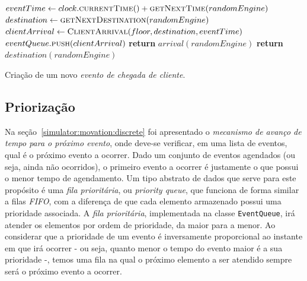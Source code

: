 \begin{description}
  \begin{algorithm}[htb]
  \begin{center}
  \begin{algorithmic}[1]
    \State $eventTime \leftarrow clock.\Call{currentTime}{}() + \Call{getNextTime}{randomEngine}$
    \State $destination \leftarrow \Call{getNextDestination}{randomEngine}$
    \State $clientArrival \leftarrow \Call{ClientArrival}{floor, destination, eventTime}$
    \State $eventQueue.\Call{push}{clientArrival}$
  \EndFunction
  \State
    \State \textbf{return} $arrival(randomEngine)$
  \EndFunction
  \State
    \State \textbf{return} $destination(randomEngine)$
  \EndFunction
  \end{algorithmic}
  \end{center}
  \caption{\label{alg:eventcreation}Criação de um novo \textit{evento de chegada de cliente}.}
  \end{algorithm}
\end{description}

\subsection{Priorização} \label{model:queue}

Na seção~\ref{simulator:movation:discrete} foi apresentado o \textit{mecanismo
de avanço de tempo para o próximo evento}, onde deve-se verificar, em uma lista
de eventos, qual é o próximo evento a ocorrer. Dado um conjunto de eventos
agendados (ou seja, ainda não ocorridos), o primeiro evento a ocorrer é
justamente o que possui o menor tempo de agendamento. Um tipo abstrato de dados
que serve para este propósito é uma \textit{fila prioritária}, ou
\textit{priority queue}, que funciona de forma similar a filas \textit{FIFO},
com a diferença de que cada elemento armazenado possui uma prioridade associada.
A \textit{fila prioritária}, implementada na classe \texttt{EventQueue}, irá
atender os elementos por ordem de prioridade, da maior para a menor. Ao
considerar que a prioridade de um evento é inversamente proporcional ao instante
em que irá ocorrer - ou seja, quanto menor o tempo do evento maior é a sua
prioridade -, temos uma fila na qual o próximo elemento a ser atendido sempre
será o próximo evento a ocorrer.

